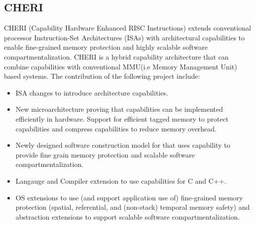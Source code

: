 




\subsection{CHERI \cite{CHERI}}
CHERI (Capability Hardware Enhanced RISC Instructions) extends conventional processor
Instruction-Set Architectures (ISAs) with architectural capabilities to enable fine-grained
memory protection and highly scalable software compartmentalization. CHERI is a hybrid 
capability architecture that can combine capabilities with conventional MMU(i.e Memory Management
 Unit) based systems. The contribution of the following project include: 
\begin{itemize}
  \item ISA changes to introduce architecture capabilities.
  \item New microarchitecture proving that capabilities can be implemented efficiently 
        in hardware. Support for efficient tagged memory to protect capabilities and
        compress capabilities to reduce memory overhead.   
  \item Newly designed software construction model for that uses capability to provide
        fine grain memory protection and scalable software compartmentalization.  
  \item Langauge and Compiler extension to use capabilities for C and C++.
  \item OS extensions to use (and support application use of) fine-grained memory protection
        (spatial, referential, and (non-stack) temporal memory safety) and abstraction extensions
        to support scalable software compartmentalization. 
\end{itemize}
	
